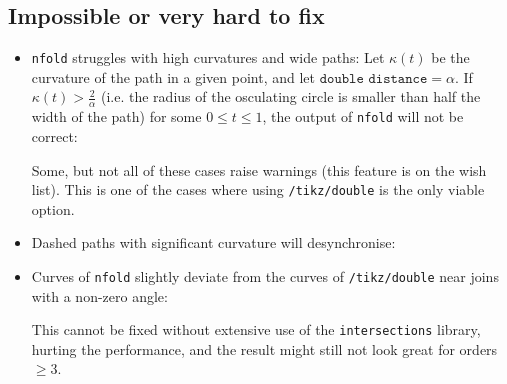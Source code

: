 \documentclass[12pt,a4paper]{article}
\theoremstyle{definition}
\newcommand{\tikzdouble}{\texttt{/tikz/double}}
\newcommand{\nfold}{\texttt{nfold}}
\begin{document}
\subsection{Impossible or very hard to fix}
\begin{itemize}
  \item \nfold{} struggles with high curvatures and wide paths: Let $\kappa(t)$ be the curvature of the path in a given point, and let $\texttt{double distance} = \alpha$. If $\kappa(t) > \frac{2}{\alpha}$ (i.e. the radius of the osculating circle is smaller than half the width of the path) for some $0 \leq t \leq 1$, the output of \nfold{} will not be correct:
\begin{tkzexample}[latex=3.5cm]
\end{tkzexample}
  Some, but not all of these cases raise warnings (this feature is on the wish list). This is one of the cases where using \tikzdouble{} is the only viable option.
  \item Dashed paths with significant curvature will desynchronise:
\begin{tkzexample}[latex=3cm]
\end{tkzexample}
  \item Curves of \nfold{} slightly deviate from the curves of \tikzdouble{} near joins with a non-zero angle:
\begin{tkzexample}[latex=3.5cm]
\end{tkzexample}
  This cannot be fixed without extensive use of the \texttt{intersections} library, hurting the performance, and the result might still not look great for orders $\geq 3$.

\end{itemize}
\end{document}
